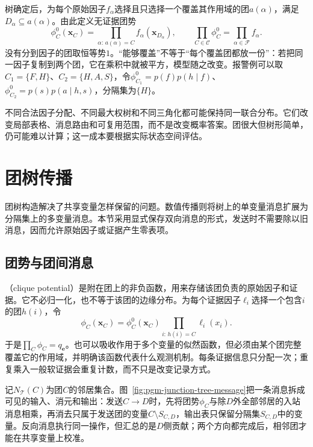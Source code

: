 树确定后，为每个原始因子$f_\alpha$选择且只选择一个覆盖其作用域的团$a(\alpha)$，满足$D_\alpha\subseteq a(\alpha)$。由此定义无证据团势
\begin{equation}
  \phi_C^0(\bm{x}_C)
    =\prod_{\alpha:\,a(\alpha)=C}f_\alpha(\bm{x}_{D_\alpha}),
  \qquad
  \prod_{C\in\mathcal{C}}\phi_C^0
    =\prod_{\alpha\in\mathcal{F}}f_\alpha.
  \label{eq:pgm-junction-tree-factor-assignment}
\end{equation}
没有分到因子的团取恒等势$1$。“能够覆盖”不等于“每个覆盖团都放一份”：若把同一因子复制到两个团，它在乘积中就被平方，模型随之改变。报警例可以取$C_1=\{F,H\}$、$C_2=\{H,A,S\}$，令$\phi_{C_1}^0=p(f)p(h\mid f)$、$\phi_{C_2}^0=p(s)p(a\mid h,s)$，分隔集为$\{H\}$。

不同合法因子分配、不同最大权树和不同三角化都可能保持同一联合分布。它们改变局部表格、消息路由和可复用范围，而不是改变概率答案。团很大但树形简单，仍可能难以计算；这一成本要根据实际状态空间评估。

\section{团树传播}
\label{sec:pgm-junction-tree-propagation}

团树构造解决了共享变量怎样保留的问题。数值传播则将树上的单变量消息扩展为分隔集上的多变量消息。本节采用显式保存双向消息的形式，发送时不需要除以旧消息，因而允许原始因子或证据产生零表项。

\subsection{团势与团间消息}
\label{sec:pgm-junction-tree-clique-messages}

（clique potential）是附在团上的非负函数，用来存储该团负责的原始因子和证据。它不必归一化，也不等于该团的边缘分布。为每个证据因子$\ell_i$选择一个包含$i$的团$h(i)$，令
\begin{equation}
  \phi_C(\bm{x}_C)=\phi_C^0(\bm{x}_C)
    \prod_{i:\,h(i)=C}\ell_i(x_i).
  \label{eq:pgm-junction-tree-local-evidence}
\end{equation}
于是$\prod_C\phi_C=q_{\bm{e}}$。也可以吸收作用于多个变量的似然函数，但必须由某个团完整覆盖它的作用域，并明确该函数代表什么观测机制。每条证据信息只分配一次；重复乘入一般软证据会重复计数，而不只是改变记录方式。

记$N_{\mathcal{T}}(C)$为团$C$的邻居集合。图~\ref{fig:pgm-junction-tree-message}把一条消息拆成可见的输入、消元和输出：发送$C\to D$时，先将团势$\phi_C$与除$D$外全部邻居的入站消息相乘，再消去只属于发送团的变量$C\setminus S_{C,D}$，输出表只保留分隔集$S_{C,D}$中的变量。反向消息执行同一操作，但汇总的是$D$侧贡献；两个方向都完成后，相邻团才能在共享变量上校准。

